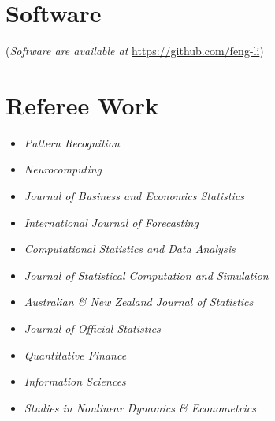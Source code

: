 \documentclass[twoside,a4paper,11pt]{amsart}
\begin{document}
\printbibliography[heading=none,  nottype=software]

\section*{Software}
{\footnotesize (\emph{Software are available at} \url{https://github.com/feng-li})}
\nocite{gratis}
\nocite{spark-dlsa}
\printbibliography[heading=none, type=software]

% 
% 



\section*{Referee Work}
\begin{itemize}
\item \emph{Pattern Recognition}
\item \emph{Neurocomputing}
\item  \emph{Journal of Business and Economics Statistics}
\item  \emph{International Journal of Forecasting}
\item  \emph{Computational Statistics and Data Analysis}
\item  \emph{Journal of Statistical Computation and Simulation}
\item  \emph{Australian \& New Zealand Journal of Statistics}
\item  \emph{Journal of Official Statistics}
\item  \emph{Quantitative Finance}
\item  \emph{Information Sciences}
\item  \emph{Studies in Nonlinear Dynamics \& Econometrics}

\end{itemize}
\end{document}
